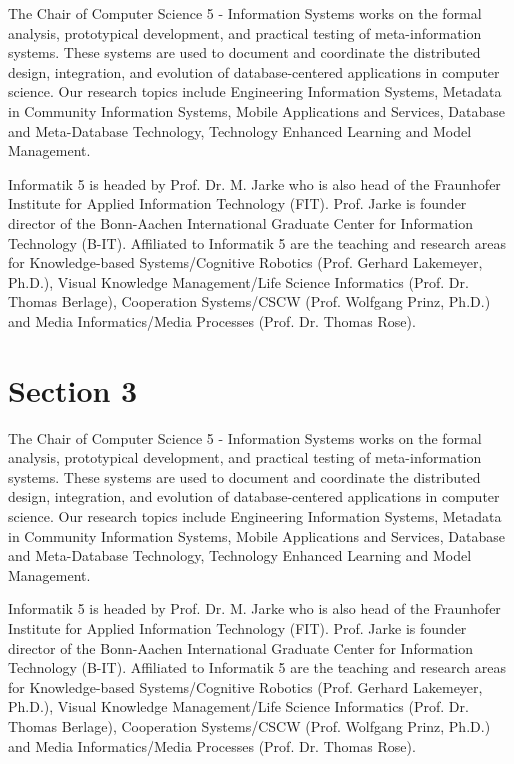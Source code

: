 The Chair of Computer Science 5 - Information Systems works on the formal
analysis, prototypical development, and practical testing of meta-information
systems. These systems are used to document and coordinate the distributed
design, integration, and evolution of database-centered applications in computer
science. Our research topics include Engineering Information Systems, Metadata
in Community Information Systems, Mobile Applications and Services, Database and
Meta-Database Technology, Technology Enhanced Learning and Model Management.

Informatik 5 is headed by Prof. Dr. M. Jarke who is also head of the Fraunhofer
Institute for Applied Information Technology (FIT). Prof. Jarke is founder
director of the Bonn-Aachen International Graduate Center for Information
Technology (B-IT). Affiliated to Informatik 5 are the teaching and research
areas for Knowledge-based Systems/Cognitive Robotics (Prof. Gerhard Lakemeyer,
Ph.D.), Visual Knowledge Management/Life Science Informatics (Prof. Dr. Thomas
Berlage), Cooperation Systems/CSCW (Prof. Wolfgang Prinz, Ph.D.) and Media
Informatics/Media Processes (Prof. Dr. Thomas Rose).


\section{Section 3}


The Chair of Computer Science 5 - Information Systems works on the formal
analysis, prototypical development, and practical testing of meta-information
systems. These systems are used to document and coordinate the distributed
design, integration, and evolution of database-centered applications in computer
science. Our research topics include Engineering Information Systems, Metadata
in Community Information Systems, Mobile Applications and Services, Database and
Meta-Database Technology, Technology Enhanced Learning and Model Management.

Informatik 5 is headed by Prof. Dr. M. Jarke who is also head of the Fraunhofer
Institute for Applied Information Technology (FIT). Prof. Jarke is founder
director of the Bonn-Aachen International Graduate Center for Information
Technology (B-IT). Affiliated to Informatik 5 are the teaching and research
areas for Knowledge-based Systems/Cognitive Robotics (Prof. Gerhard Lakemeyer,
Ph.D.), Visual Knowledge Management/Life Science Informatics (Prof. Dr. Thomas
Berlage), Cooperation Systems/CSCW (Prof. Wolfgang Prinz, Ph.D.) and Media
Informatics/Media Processes (Prof. Dr. Thomas Rose).


